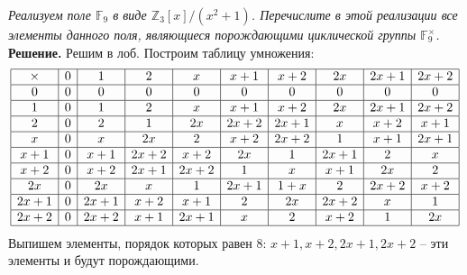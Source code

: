 \documentclass[a4paper, 10pt]{article}
\newcommand{\Z}{\mathbb{Z}}
\newcommand{\F}{\mathbb{F}}
\begin{document}
\begin{spacing}{1}
\noindent \textit{Реализуем поле $\F_9$ в виде $\Z_3[x]/(x^2 + 1)$. Перечислите в этой реализации все элементы данного поля, являющиеся порождающими циклической группы $\F_9^\times$.
}\\
\noindent \textbf{Решение.} Решим в лоб. Построим таблицу умножения:
$$
\begin{array}{|c|c|c|c|c|c|c|c|c|c|}
\hline
\times	& 0 & 1 & 2 & x & x + 1 & x + 2 & 2x & 2x + 1 & 2x + 2\\
\hline
0		& 0 & 0 & 0 & 0 & 0 & 0 & 0 & 0 & 0\\
\hline
1		& 0 & 1 & 2 & x & x + 1 & x + 2 & 2x & 2x + 1 & 2x + 2\\
\hline
2		& 0 & 2 & 1 & 2x & 2x + 2 & 2x + 1 & x & x + 2 & x + 1\\
\hline
x		& 0 & x & 2x & 2 & x + 2 & 2x + 2 & 1 & x + 1 & 2x + 1\\
\hline
x + 1	& 0 & x + 1 & 2x + 2 & x + 2 & 2x & 1 & 2x + 1 & 2 & x\\
\hline
x + 2	& 0 & x + 2 & 2x + 1 & 2x + 2 & 1 & x & x + 1 & 2x & 2\\
\hline
2x		& 0 & 2x & x & 1 & 2x + 1 & 1 + x & 2 & 2x + 2 & x + 2\\
\hline
2x + 1	& 0 & 2x + 1 & x + 2 & x + 1 & 2 & 2x & 2x + 2 & x & 1\\
\hline
2x + 2	& 0 & 2x + 2 & x + 1 & 2x + 1 & x & 2 & x + 2 & 1 & 2x\\
\hline
\end{array}
$$
Выпишем элементы, порядок которых равен 8: $x + 1, x + 2, 2x + 1, 2x + 2$ -- эти элементы и будут порождающими.
		

\end{spacing}
\end{document}
